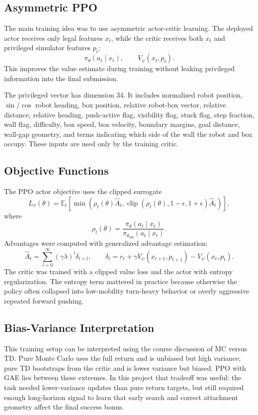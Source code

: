 \documentclass[11pt]{article}
\begin{document}
\subsection{Asymmetric PPO}

The main training idea was to use asymmetric actor-critic learning. The deployed actor
receives only legal features \(x_t\), while the critic receives both \(x_t\) and privileged
simulator features \(p_t\):
\[
  \pi_\theta(a_t\mid x_t),
  \qquad
  V_\psi(x_t,p_t).
\]
This improves the value estimate during training without leaking privileged information
into the final submission.

The privileged vector has dimension 34. It includes normalized robot position,
\(\sin/\cos\) robot heading, box position, relative robot-box vector, relative distance,
relative heading, push-active flag, visibility flag, stuck flag, step fraction, wall flag,
difficulty, box speed, box velocity, boundary margins, goal distance, wall-gap geometry,
and terms indicating which side of the wall the robot and box occupy. These inputs are
used only by the training critic.

\subsection{Objective Functions}

The PPO actor objective uses the clipped surrogate
\[
  L_{\pi}(\theta)=
  \mathbb{E}_t\left[
    \min\left(
      \rho_t(\theta)\hat{A}_t,
      \operatorname{clip}(\rho_t(\theta),1-\epsilon,1+\epsilon)\hat{A}_t
    \right)
  \right],
\]
where
\[
  \rho_t(\theta)=
  \frac{\pi_\theta(a_t\mid x_t)}{\pi_{\theta_{\text{old}}}(a_t\mid x_t)}.
\]
Advantages were computed with generalized advantage estimation:
\[
  \hat{A}_t=
  \sum_{l=0}^{\infty}(\gamma\lambda)^l\delta_{t+l},
  \qquad
  \delta_t=r_t + \gamma V_\psi(x_{t+1},p_{t+1}) - V_\psi(x_t,p_t).
\]
The critic was trained with a clipped value loss and the actor with entropy
regularization. The entropy term mattered in practice because otherwise the policy often
collapsed into low-mobility turn-heavy behavior or overly aggressive repeated forward
pushing.

\subsection{Bias-Variance Interpretation}

This training setup can be interpreted using the course discussion of MC versus TD.
Pure Monte Carlo uses the full return and is unbiased but high variance; pure TD
bootstraps from the critic and is lower variance but biased. PPO with GAE lies between
these extremes. In this project that tradeoff was useful: the task needed lower-variance
updates than pure return targets, but still required enough long-horizon signal to learn
that early search and correct attachment geometry affect the final success bonus.
\end{document}
